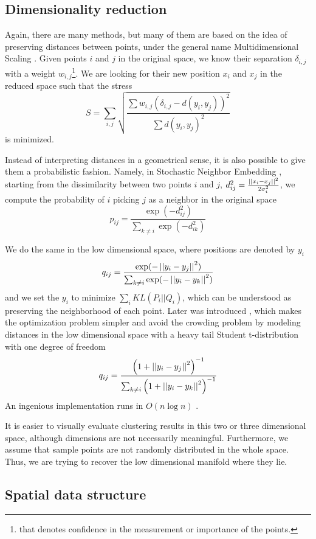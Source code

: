 \subsection{Dimensionality reduction}

Again, there are many methods, but many of them are based on the idea of
preserving distances between points, under the general name Multidimensional
Scaling \autocite{MDS77}. Given points $i$ and $j$ in the original space, we
know their separation $\delta_{i,j}$ with a weight $w_{i,j}$\footnote{that
denotes confidence in the measurement or importance of the points.}. We are
looking for their new position $x_i$ and $x_j$ in the reduced space such that
the stress \[ S = \sum_{i,j} \sqrt{\frac{\sum w_{i,j}(\delta_{i,j} - d(y_i,
y_j))^2}{\sum d(y_i, y_j)^2}} \] is minimized.

Instead of interpreting distances in a geometrical sense, it is also possible
to give them a probabilistic fashion. Namely, in Stochastic Neighbor Embedding
\autocite{SNE02}, starting from the dissimilarity between two points $i$ and
$j$, $d^2_{ij} = \frac{\left|\left|x_i - x_j\right|\right|^2}{2\sigma^2_i}$, we compute the
probability of $i$ picking $j$ as a neighbor in the original space \[ p_{ij} =
\frac{\exp(-d_{ij}^2)}{\sum_{k \neq i}\exp(-d_{ik}^2)}\]

We do the same in the low dimensional space, where positions are denoted by
$y_i$ \[ q_{ij} = \frac{\exp(-\left|\left|y_i - y_j\right|\right|^2)}{\sum_{k \neq
i}\exp(-\left|\left|y_i - y_k\right|\right|^2)}\] and we set the $y_i$ to minimize $\sum_i
KL(P_i || Q_i)$, which can be understood as preserving the neighborhood of each
point. Later was introduced \tsne{} \autocite{tSNE08}, which makes the
optimization problem simpler and avoid the crowding problem by modeling
distances in the low dimensional space with a heavy tail Student t-distribution
with one degree of freedom \[ q_{ij} = \frac{\left(1+\left|\left|y_i -
y_j\right|\right|^2\right)^{-1}}{\sum_{k \neq i}\left(1+\left|\left|y_i - y_k\right|\right|^2\right)^{-1}}\]
An ingenious implementation runs in $O(n\log n)$ \autocite{BarnesHut13}.

It is easier to visually evaluate clustering results in this two or three
dimensional space, although dimensions are not necessarily meaningful.
Furthermore, we assume that sample points are not randomly distributed in the
whole space. Thus, we are trying to recover the low dimensional manifold where
they lie.

\subsection{Spatial data structure}
\label{sub:spatial-structures}

